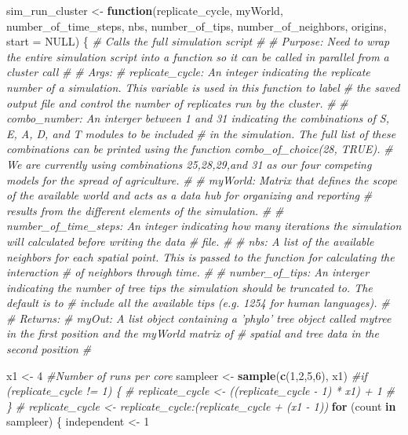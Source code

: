 \documentclass[]{book}
\newenvironment{Shaded}{\begin{snugshade}}{\end{snugshade}}
\newcommand{\KeywordTok}[1]{\textcolor[rgb]{0.13,0.29,0.53}{\textbf{{#1}}}}
\newcommand{\DataTypeTok}[1]{\textcolor[rgb]{0.13,0.29,0.53}{{#1}}}
\newcommand{\DecValTok}[1]{\textcolor[rgb]{0.00,0.00,0.81}{{#1}}}
\newcommand{\StringTok}[1]{\textcolor[rgb]{0.31,0.60,0.02}{{#1}}}
\newcommand{\CommentTok}[1]{\textcolor[rgb]{0.56,0.35,0.01}{\textit{{#1}}}}
\newcommand{\OtherTok}[1]{\textcolor[rgb]{0.56,0.35,0.01}{{#1}}}
\newcommand{\ControlFlowTok}[1]{\textcolor[rgb]{0.13,0.29,0.53}{\textbf{{#1}}}}
\newcommand{\NormalTok}[1]{{#1}}
\theoremstyle{definition}
\theoremstyle{definition}
\theoremstyle{definition}
\theoremstyle{remark}
\begin{document}
\begin{Shaded}
\begin{Highlighting}[]
\NormalTok{sim_run_cluster <-}\StringTok{ }\ControlFlowTok{function}\NormalTok{(replicate_cycle, myWorld, number_of_time_steps, nbs,}
\NormalTok{                            number_of_tips, number_of_neighbors, origins, }\DataTypeTok{start =} \OtherTok{NULL}\NormalTok{) \{}
  \CommentTok{# Calls the full simulation script }
  \CommentTok{#  }
  \CommentTok{# Purpose: Need to wrap the entire simulation script into a function so it can be called in parallel from a cluster call  }
  \CommentTok{#}
  \CommentTok{# Args:}
  \CommentTok{#    replicate_cycle: An integer indicating the replicate number of a simulation. This variable is used in this function to label        }
  \CommentTok{#         the saved output file and control the number of replicates run by the cluster.}
  \CommentTok{#}
  \CommentTok{#    combo_number: An interger between 1 and 31 indicating the combinations of S, E, A, D, and T modules to be included }
  \CommentTok{#         in the simulation. The full list of these combinations can be printed using the function combo_of_choice(28, TRUE).}
  \CommentTok{#         We are currently using combinations 25,28,29,and 31 as our four competing models for the spread of agriculture.  }
  \CommentTok{#}
  \CommentTok{#    myWorld: Matrix that defines the scope of the available world and acts as a data hub for organizing and reporting      }
  \CommentTok{#         results from the different elements of the simulation. }
  \CommentTok{#}
  \CommentTok{#    number_of_time_steps: An integer indicating how many iterations the simulation will calculated before writing the data }
  \CommentTok{#         file. }
  \CommentTok{#}
  \CommentTok{#    nbs: A list of the available neighbors for each spatial point. This is passed to the function for calculating the interaction }
  \CommentTok{#         of neighbors through time. }
  \CommentTok{#}
  \CommentTok{#    number_of_tips: An interger indicating the number of tree tips the simulation should be truncated to. The default is to }
  \CommentTok{#         include all the available tips (e.g. 1254 for human languages). }
  \CommentTok{#}
  \CommentTok{# Returns: }
  \CommentTok{#    myOut: A list object containing a 'phylo' tree object called mytree in the first position and the myWorld matrix of }
  \CommentTok{#         spatial and tree data in the second position }
  \CommentTok{#     }
  

\NormalTok{  x1 <-}\StringTok{ }\DecValTok{4} \CommentTok{#Number of runs per core}
\NormalTok{  sampleer <-}\StringTok{ }\KeywordTok{sample}\NormalTok{(}\KeywordTok{c}\NormalTok{(}\DecValTok{1}\NormalTok{,}\DecValTok{2}\NormalTok{,}\DecValTok{5}\NormalTok{,}\DecValTok{6}\NormalTok{), x1)}
  \CommentTok{#if (replicate_cycle != 1) \{}
  \CommentTok{#  replicate_cycle <- ((replicate_cycle - 1) * x1) + 1}
 \CommentTok{# \}}
 \CommentTok{# replicate_cycle <- replicate_cycle:(replicate_cycle + (x1 - 1))}
  \ControlFlowTok{for}\NormalTok{ (count }\ControlFlowTok{in}\NormalTok{ sampleer) \{}
\NormalTok{  independent <-}\StringTok{ }\DecValTok{1} 


\end{Highlighting}
\end{Shaded}
\end{document}
